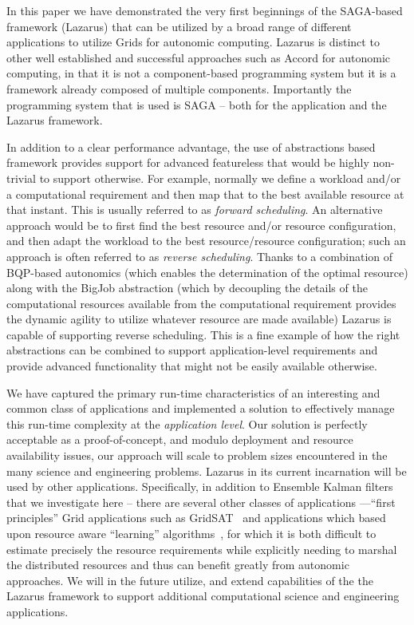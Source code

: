 \documentclass{sig-alternate}
\begin{document}
In this paper we have demonstrated the very first beginnings of the
SAGA-based framework (Lazarus) that can be utilized by a broad range
of different applications to utilize Grids for autonomic computing.
Lazarus is distinct to other well established and successful
approaches such as Accord for autonomic computing, in that it is not a
component-based programming system but it is a framework already
composed of multiple components. Importantly the programming system
that is used is SAGA -- both for the application and the Lazarus
framework.

In addition to a clear performance advantage, the use of abstractions
based framework provides support for advanced featureless that would be
highly non-trivial to support otherwise.  For example, normally we
define a workload and/or a computational requirement and then map that
to the best available resource at that instant.  This is usually
referred to as {\it forward scheduling}.  An alternative approach
would be to first find the best resource and/or resource
configuration, and then adapt the workload to the best
resource/resource configuration; such an approach is often referred to
as {\it reverse scheduling}.  Thanks to a combination of BQP-based
autonomics (which enables the determination of the optimal resource)
along with the BigJob abstraction (which by decoupling the details of
the computational resources available from the computational
requirement provides the dynamic agility to utilize whatever resource
are made available) Lazarus is capable of supporting reverse
scheduling. This is a fine example of how the right abstractions can
be combined to support application-level requirements and provide
advanced functionality that might not be easily available otherwise.

We have captured the primary run-time characteristics of an
interesting and common class of applications and implemented a
solution to effectively manage this run-time complexity at the {\it
  application level}.  Our solution is perfectly acceptable as a
proof-of-concept, and modulo deployment and resource availability
issues, our approach will scale to problem sizes encountered in the
many science and engineering problems.  Lazarus in its current
incarnation will be used by other applications. Specifically, in
addition to Ensemble Kalman filters %
that we investigate here -- there are several other classes of
applications ---``first principles'' Grid applications such as
GridSAT~\cite{gridsat03} and applications which based upon resource
aware ``learning'' algorithms~\cite{ majority_voting}, for which it is
both difficult to estimate precisely the resource requirements while
explicitly needing to marshal the distributed resources and thus can
benefit greatly from autonomic approaches. We will in the future
utilize, and extend capabilities of the the Lazarus framework to
support additional computational science and engineering applications.
\end{document}

